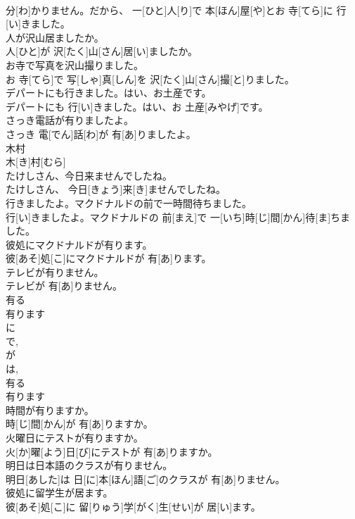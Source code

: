 \documentclass[8pt]{extreport}
\begin{document}
\begin{CJK}{UTF8}{min}
\\	分[わ]かりません。だから、 一[ひと]人[り]で 本[ほん]屋[や]とお 寺[てら]に 行[い]きました。
\\	人が沢山居ましたか。	
\\	人[ひと]が 沢[たく]山[さん]居[い]ましたか。
\\	お寺で写真を沢山撮りました。	
\\	お 寺[てら]で 写[しゃ]真[しん]を 沢[たく]山[さん]撮[と]りました。
\\	デパートにも行きました。はい、お土産です。	
\\	デパートにも 行[い]きました。はい、お 土産[みやげ]です。
\\	さっき電話が有りましたよ。	
\\	さっき 電[でん]話[わ]が 有[あ]りましたよ。
\\	木村	
\\	木[き]村[むら]	
\\	たけしさん、今日来ませんでしたね。	
\\	たけしさん、 今日[きょう]来[き]ませんでしたね。
\\	行きましたよ。マクドナルドの前で一時間待ちました。	
\\	行[い]きましたよ。マクドナルドの 前[まえ]で 一[いち]時[じ]間[かん]待[ま]ちました。
\\	彼処にマクドナルドが有ります。	
\\	彼[あそ]処[こ]にマクドナルドが 有[あ]ります。
\\	テレビが有りません。	
\\	テレビが 有[あ]りません。
\\	有る 
\\	有ります 
\\	に 
\\	で, 
\\	が 
\\	は,	
\\	有る 
\\	有ります 
\\	時間が有りますか。	
\\	時[じ]間[かん]が 有[あ]りますか。
\\	火曜日にテストが有りますか。	
\\	火[か]曜[よう]日[び]にテストが 有[あ]りますか。
\\	明日は日本語のクラスが有りません。	
\\	明日[あした]は 日[に]本[ほん]語[ご]のクラスが 有[あ]りません。
\\	彼処に留学生が居ます。	
\\	彼[あそ]処[こ]に 留[りゅう]学[がく]生[せい]が 居[い]ます。

\end{CJK}
\end{document}
